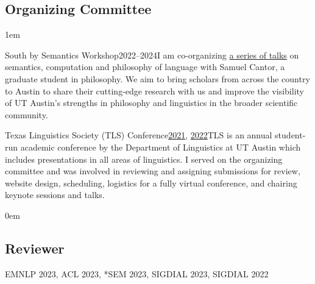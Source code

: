 \subsection{Organizing Committee}

\leftskip1em\relax

\smallentry
  {\large South by Semantics Workshop}{2022--2024}{I am co-organizing \href{https://sites.google.com/utexas.edu/sxsw/}{a series of talks} on semantics, computation and philosophy of language with Samuel Cantor, a graduate student in philosophy. We aim  to bring scholars from across the country to Austin to share their cutting-edge research with us and improve the visibility of UT Austin’s strengths in philosophy and linguistics in the broader scientific community.}
  
\smallentry
    {\large Texas Linguistics Society (TLS) Conference}{\href{http://tls.ling.utexas.edu/2021/}{2021}, \href{http://tls.ling.utexas.edu/2022/}{2022}}{TLS is an annual student-run academic conference by the Department of Linguistics at UT Austin which includes presentations in all areas of linguistics. I served on the organizing committee and was involved in reviewing and assigning submissions for review, website design, scheduling, logistics for a fully virtual conference, and chairing keynote sessions and talks.}

\leftskip0em\relax

\subsection{Reviewer}

\quad EMNLP 2023, ACL 2023, *SEM 2023, SIGDIAL 2023, SIGDIAL 2022
